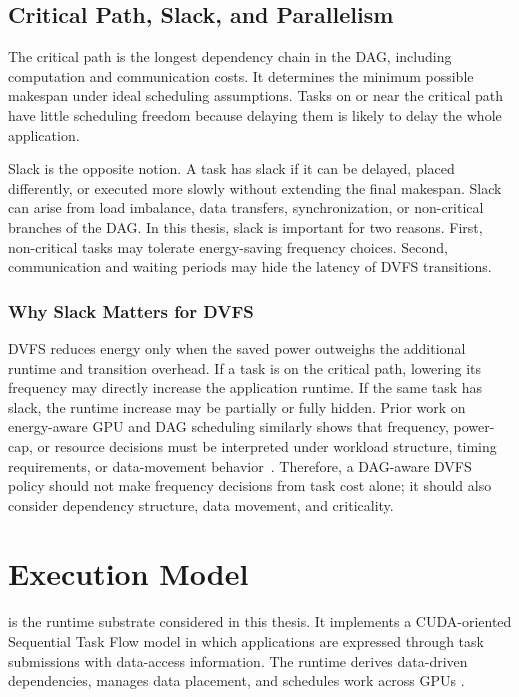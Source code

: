 \subsection{Critical Path, Slack, and Parallelism}
\label{subsec:critical_path_slack}

The critical path is the longest dependency chain in the DAG, including computation and communication costs. It determines the minimum possible makespan under ideal scheduling assumptions. Tasks on or near the critical path have little scheduling freedom because delaying them is likely to delay the whole application.

Slack is the opposite notion. A task has slack if it can be delayed, placed differently, or executed more slowly without extending the final makespan. Slack can arise from load imbalance, data transfers, synchronization, or non-critical branches of the DAG. In this thesis, slack is important for two reasons. First, non-critical tasks may tolerate energy-saving frequency choices. Second, communication and waiting periods may hide the latency of DVFS transitions.

\subsubsection{Why Slack Matters for DVFS}
\label{subsubsec:slack_for_dvfs}

DVFS reduces energy only when the saved power outweighs the additional runtime and transition overhead. If a task is on the critical path, lowering its frequency may directly increase the application runtime. If the same task has slack, the runtime increase may be partially or fully hidden. Prior work on energy-aware GPU and DAG scheduling similarly shows that frequency, power-cap, or resource decisions must be interpreted under workload structure, timing requirements, or data-movement behavior~\cite{Song2014MemoryGPGPU,Wang2021RealTimeGPU,Wang2022EnergyAware,Guo2019EnergyEfficient,Huang2020TaskBalance,DAviau2025PowerCapping,Chab2025GPUSchedulingSurvey}. Therefore, a DAG-aware DVFS policy should not make frequency decisions from task cost alone; it should also consider dependency structure, data movement, and criticality.

\section{\CUDASTF{} Execution Model}
\label{sec:theory_cudastf}

\CUDASTF{} is the runtime substrate considered in this thesis. It implements a CUDA-oriented Sequential Task Flow model in which applications are expressed through task submissions with data-access information. The runtime derives data-driven dependencies, manages data placement, and schedules work across GPUs \cite{Augonnet2024CUDASTF}.

